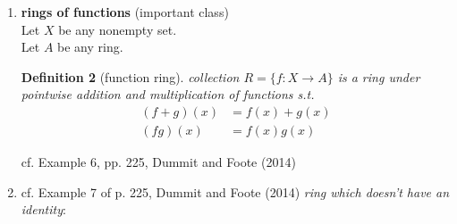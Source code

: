 \documentclass[10pt]{amsart}
\newtheorem{definition}{Definition}
\begin{document}
\begin{multicols*}{2}
\begin{enumerate}
\begin{definition}[(real) Hamiltonian Quaternions]
\begin{equation}
\begin{aligned}
		& ki = -ik = j
		\end{aligned}
		\end{equation}
	\end{definition}
Working out the multiplication
\[
\begin{gathered}
(a+bi + cj + dk)(a'+b'i + c'j + d'k) =  \\
= \begin{aligned}
& aa' + ab' i + ac'j + ad'k + ba' i - bb' + bc' k -bd' j + \\
& ca'j - cb' k - cc' + cd' i + da' k + db' j - dc' i -dd' = \\
\end{aligned} \\
= aa' - bb' -cc' -dd' + (ab' + ba' + cd' -dc')i + (ac' - bd' + ca' +db')j + (ad' + bc' - cb' + da')k 
\end{gathered}
\]
Hamiltonian Quaternions are noncommutative ring with identity ($1= 1 + 0i + 0j + 0k$). 

Similarly define \emph{rational} Hamiltonian Quaternions ring by taking $a,b,c,d\in \mathbb{Q}$.  

real and rational Hamiltonian Quaternions both are divison rings, where inverse of nonzero element defined as 


\begin{equation}
(a+bi +cj + dk)^{-1} = \frac{ a-bi -cj -dk}{ a^2 + b^2 + c^2 + d^2 }
\end{equation} cf. Example 5, pp. 224, Dummit and Foote (2014)\cite{DuFo2003}

\item \textbf{rings of functions} (important class) \\
Let $X$ be any nonempty set. \\
Let $A$ be any ring. 

\begin{definition}[function ring]
	collection $R= \lbrace f:X\to A \rbrace$ is a ring under pointwise addition and multiplication of functions s.t. 
	\begin{equation}
	\begin{aligned}
	(f+g)(x) & = f(x) + g(x) \\
	(fg)(x) & = f(x)g(x)
	\end{aligned}
	\end{equation}
\end{definition}
	
cf. Example 6, pp. 225, Dummit and Foote (2014)\cite{DuFo2003}

\item cf. Example 7 of p. 225, Dummit and Foote (2014)\cite{DuFo2003} \emph{ring which doesn't have an identity}:


\end{enumerate}
\end{multicols*}
\end{document}
